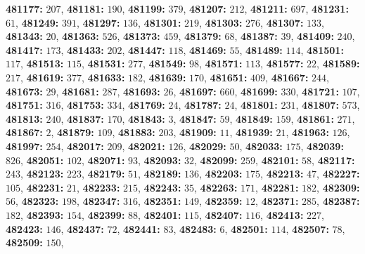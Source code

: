 \textsf{\bfseries 481177:} $207$, \textsf{\bfseries 481181:} $190$, \textsf{\bfseries 481199:} $379$, \textsf{\bfseries 481207:} $212$, \textsf{\bfseries 481211:} $697$, \textsf{\bfseries 481231:} $61$, \textsf{\bfseries 481249:} $391$, \textsf{\bfseries 481297:} $136$, \textsf{\bfseries 481301:} $219$, \textsf{\bfseries 481303:} $276$, \textsf{\bfseries 481307:} $133$, \textsf{\bfseries 481343:} $20$, \textsf{\bfseries 481363:} $526$, \textsf{\bfseries 481373:} $459$, \textsf{\bfseries 481379:} $68$, \textsf{\bfseries 481387:} $39$, \textsf{\bfseries 481409:} $240$, \textsf{\bfseries 481417:} $173$, \textsf{\bfseries 481433:} $202$, \textsf{\bfseries 481447:} $118$, \textsf{\bfseries 481469:} $55$, \textsf{\bfseries 481489:} $114$, \textsf{\bfseries 481501:} $117$, \textsf{\bfseries 481513:} $115$, \textsf{\bfseries 481531:} $277$, \textsf{\bfseries 481549:} $98$, \textsf{\bfseries 481571:} $113$, \textsf{\bfseries 481577:} $22$, \textsf{\bfseries 481589:} $217$, \textsf{\bfseries 481619:} $377$, \textsf{\bfseries 481633:} $182$, \textsf{\bfseries 481639:} $170$, \textsf{\bfseries 481651:} $409$, \textsf{\bfseries 481667:} $244$, \textsf{\bfseries 481673:} $29$, \textsf{\bfseries 481681:} $287$, \textsf{\bfseries 481693:} $26$, \textsf{\bfseries 481697:} $660$, \textsf{\bfseries 481699:} $330$, \textsf{\bfseries 481721:} $107$, \textsf{\bfseries 481751:} $316$, \textsf{\bfseries 481753:} $334$, \textsf{\bfseries 481769:} $24$, \textsf{\bfseries 481787:} $24$, \textsf{\bfseries 481801:} $231$, \textsf{\bfseries 481807:} $573$, \textsf{\bfseries 481813:} $240$, \textsf{\bfseries 481837:} $170$, \textsf{\bfseries 481843:} $3$, \textsf{\bfseries 481847:} $59$, \textsf{\bfseries 481849:} $159$, \textsf{\bfseries 481861:} $271$, \textsf{\bfseries 481867:} $2$, \textsf{\bfseries 481879:} $109$, \textsf{\bfseries 481883:} $203$, \textsf{\bfseries 481909:} $11$, \textsf{\bfseries 481939:} $21$, \textsf{\bfseries 481963:} $126$, \textsf{\bfseries 481997:} $254$, \textsf{\bfseries 482017:} $209$, \textsf{\bfseries 482021:} $126$, \textsf{\bfseries 482029:} $50$, \textsf{\bfseries 482033:} $175$, \textsf{\bfseries 482039:} $826$, \textsf{\bfseries 482051:} $102$, \textsf{\bfseries 482071:} $93$, \textsf{\bfseries 482093:} $32$, \textsf{\bfseries 482099:} $259$, \textsf{\bfseries 482101:} $58$, \textsf{\bfseries 482117:} $243$, \textsf{\bfseries 482123:} $223$, \textsf{\bfseries 482179:} $51$, \textsf{\bfseries 482189:} $136$, \textsf{\bfseries 482203:} $175$, \textsf{\bfseries 482213:} $47$, \textsf{\bfseries 482227:} $105$, \textsf{\bfseries 482231:} $21$, \textsf{\bfseries 482233:} $215$, \textsf{\bfseries 482243:} $35$, \textsf{\bfseries 482263:} $171$, \textsf{\bfseries 482281:} $182$, \textsf{\bfseries 482309:} $56$, \textsf{\bfseries 482323:} $198$, \textsf{\bfseries 482347:} $316$, \textsf{\bfseries 482351:} $149$, \textsf{\bfseries 482359:} $12$, \textsf{\bfseries 482371:} $285$, \textsf{\bfseries 482387:} $182$, \textsf{\bfseries 482393:} $154$, \textsf{\bfseries 482399:} $88$, \textsf{\bfseries 482401:} $115$, \textsf{\bfseries 482407:} $116$, \textsf{\bfseries 482413:} $227$, \textsf{\bfseries 482423:} $146$, \textsf{\bfseries 482437:} $72$, \textsf{\bfseries 482441:} $83$, \textsf{\bfseries 482483:} $6$, \textsf{\bfseries 482501:} $114$, \textsf{\bfseries 482507:} $78$, \textsf{\bfseries 482509:} $150$, 
